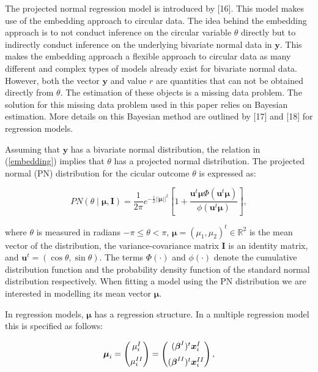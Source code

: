 \documentclass[11pt,]{article}
\begin{document}
The projected normal regression model is introduced by {[}16{]}. This
model makes use of the embedding approach to circular data. The idea
behind the embedding approach is to not conduct inference on the
circular variable \(\theta\) directly but to indirectly conduct
inference on the underlying bivariate normal data in \(\boldsymbol{y}\).
This makes the embedding approach a flexible approach to circular data
as many different and complex types of models already exist for
bivariate normal data. However, both the vector \(\boldsymbol{y}\) and
value \(r\) are quantities that can not be obtained directly from
\(\theta\). The estimation of these objects is a missing data problem.
The solution for this missing data problem used in this paper relies on
Bayesian estimation. More details on this Bayesian method are outlined
by {[}17{]} and {[}18{]} for regression models.

Assuming that \(\boldsymbol{y}\) has a bivariate normal distribution,
the relation in (\ref{embedding}) implies that \(\theta\) has a
projected normal distribution. The projected normal (PN) distribution
for the cicular outcome \(\theta\) is expressed as:

\begin{equation}\label{PN} PN(\theta \mid \boldsymbol{\mu}, \boldsymbol{I})  =
\frac{1}{2 \pi} e^{-\frac{1}{2}\vert \vert \boldsymbol\mu \vert \vert ^ 2}
\left[1+\frac{\boldsymbol{u}^t\boldsymbol\mu\Phi(\boldsymbol{u}^t\boldsymbol\mu)}{\phi(\boldsymbol{u}^t\boldsymbol\mu)}\right],
\end{equation}

where \(\theta\) is measured in radians \(-\pi \leq \theta < \pi\),
\(\boldsymbol{\mu} = (\mu_{1}, \mu_{2})^{t} \in \mathbb{R}^2\) is the
mean vector of the distribution, the variance-covariance matrix
\(\boldsymbol{I}\) is an identity matrix, and
\(\boldsymbol{u}^{t} = (\cos \theta, \sin \theta)\). The terms
\(\Phi(\cdot)\) and \(\phi(\cdot)\) denote the cumulative distribution
function and the probability density function of the standard normal
distribution respectively. When fitting a model using the PN
distribution we are interested in modelling its mean vector
\(\boldsymbol{\mu}\).

In regression models, \(\boldsymbol{\mu}\) has a regression structure.
In a multiple regression model this is specified as follows:

\begin{equation}\label{regression}
\boldsymbol{\mu}_{i} = \begin{pmatrix}
  \mu_{i}^{I}  \vspace{0.2cm}  \\
\mu_{i}^{II}
 \end{pmatrix}=\begin{pmatrix}
  (\boldsymbol{\beta}^{I})^{t}\boldsymbol{x}_{i}^{I} \vspace{0.2cm}  \\
  (\boldsymbol{\beta}^{II})^{t}\boldsymbol{x}_{i}^{II} 
 \end{pmatrix},
\end{equation}
\end{document}

